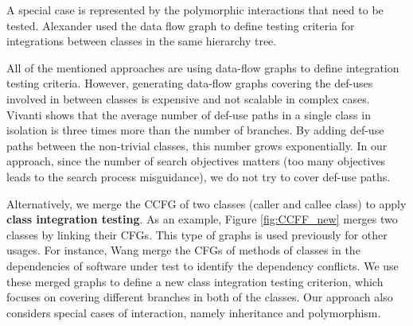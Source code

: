 
A special case is represented by the polymorphic interactions that need to be tested. Alexander \etal \cite{Alexander2000, Alexander2003, Alexander2004,Alexander2010} used the data flow graph to define testing criteria for integrations between classes in the same hierarchy tree.

 All of the mentioned approaches are using data-flow graphs to define integration testing criteria. However, generating data-flow graphs covering the def-uses involved in between classes is expensive and not scalable in complex cases. Vivanti \etal \cite{vivanti2013search} shows that the average number of def-use paths in a single class in isolation is three times more than the number of branches. By adding def-use paths between the non-trivial classes, this number grows exponentially.
 In our approach, since the number of search objectives matters (\ie too many objectives leads to the search process misguidance), we do not try to cover def-use paths. 

 Alternatively, we merge the CCFG of two classes (caller and callee class) to apply \textbf{class integration testing}. As an example, Figure \ref{fig:CCFF_new} merges two classes by linking their CFGs.
 This type of graphs is used previously for other usages. For instance, Wang \etal \cite{wang2019could} merge the CFGs of methods of classes in the dependencies of software under test to identify the dependency conflicts.
We use these merged graphs to define a new class integration testing criterion, which focuses on covering different branches in both of the classes. Our approach also considers special cases of interaction, namely inheritance and polymorphism. 



